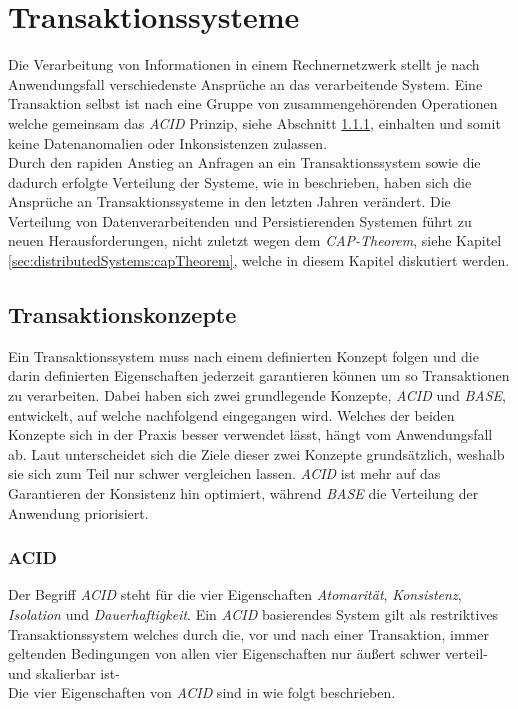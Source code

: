 \chapter{Transaktionssysteme} \label{cha:transactionSystems}
Die Verarbeitung von Informationen in einem Rechnernetzwerk stellt je nach Anwendungsfall verschiedenste Ansprüche an das verarbeitende System. Eine Transaktion selbst ist nach \cite{rahm1993HochleistungsTransaktionssysteme} eine Gruppe von zusammengehörenden Operationen welche gemeinsam das \textit{ACID} Prinzip, siehe Abschnitt \ref{sec:transactionTheory:acid}, einhalten und somit keine Datenanomalien oder Inkonsistenzen zulassen. \\
Durch den rapiden Anstieg an Anfragen an ein Transaktionssystem sowie die dadurch erfolgte Verteilung der Systeme, wie in \cite{li2017research} beschrieben, haben sich die Ansprüche an Transaktionssysteme in den letzten Jahren verändert. Die Verteilung von Datenverarbeitenden und Persistierenden Systemen führt zu neuen Herausforderungen, nicht zuletzt wegen dem \textit{CAP-Theorem}, siehe Kapitel \ref{sec:distributedSystems:capTheorem}, welche in diesem Kapitel diskutiert werden. 

\section{Transaktionskonzepte}
Ein Transaktionssystem muss nach \cite{rahm1993HochleistungsTransaktionssysteme} einem definierten Konzept folgen und die darin definierten Eigenschaften jederzeit garantieren können um so Transaktionen zu verarbeiten. Dabei haben sich zwei grundlegende Konzepte, \textit{ACID} und \textit{BASE}, entwickelt, auf welche nachfolgend eingegangen wird. Welches der beiden Konzepte sich in der Praxis besser verwendet lässt, hängt vom Anwendungsfall ab. Laut \cite{EdlichFriedlandHampeBrauer201010} unterscheidet sich die Ziele dieser zwei Konzepte grundsätzlich, weshalb sie sich zum Teil nur schwer vergleichen lassen.  \textit{ACID} ist mehr auf das Garantieren der Konsistenz hin optimiert, während \textit{BASE} die Verteilung der Anwendung priorisiert.

\subsection{ACID}\label{sec:transactionTheory:acid}
Der Begriff \textit{ACID} steht für die vier Eigenschaften \textit{Atomarität}, \textit{Konsistenz}, \textit{Isolation} und \textit{Dauerhaftigkeit}. Ein \textit{ACID} basierendes System gilt als restriktives Transaktionssystem welches durch die, vor und nach einer Transaktion,  immer geltenden Bedingungen von allen vier Eigenschaften nur äußert schwer verteil- und skalierbar ist- \cite{PritchettBASE}\\
Die vier Eigenschaften von \textit{ACID} sind in \cite{haerder198Acid} wie folgt beschrieben.

